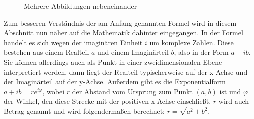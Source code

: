 \begin{figure}[bth]
  \hfill
  \hfill
  \centering{}
  \caption{Mehrere Abbildungen nebeneinander}
  \label{fig:dftEinzelneFrequenzen}
\end{figure}

Zum besseren Verständnis der am Anfang genannten Formel wird in diesem Abschnitt nun näher auf die Mathematik dahinter eingegangen. In der Formel handelt es sich wegen der imaginären Einheit $i$ um komplexe Zahlen. Diese bestehen aus einem Realteil $a$ und einem Imaginärteil $b$, also in der Form $a + ib$. Sie können allerdings auch als Punkt in einer zweidimensionalen Ebene interpretiert werden, dann liegt der Realteil typischerweise auf der x-Achse und der Imaginärteil auf der y-Achse. Außerdem gibt es die Exponentialform $a+ib=re^{i\varphi}$, wobei $r$ der Abstand vom Ursprung zum Punkt $(a,b)$ ist und $\varphi$ der Winkel, den diese Strecke mit der positiven x-Achse einschließt. $r$ wird auch Betrag genannt und wird folgendermaßen berechnet: $r=\sqrt{a^2+b^2}$. 